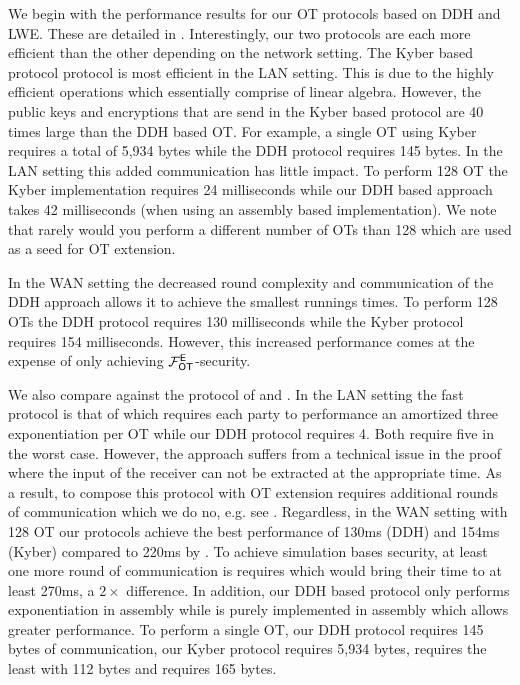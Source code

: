 We begin with the performance results for our OT protocols based on DDH and LWE. These are detailed in . Interestingly, our two protocols are each more efficient than the other depending on the network setting. The Kyber based protocol protocol is most efficient in the LAN setting. This is due to the highly efficient operations which essentially comprise of linear algebra. However, the public keys and encryptions that are send in the Kyber based protocol are 40 times large than the DDH based OT. For example, a single OT using Kyber requires a total of 5,934 bytes while the DDH protocol requires 145 bytes. In the LAN setting this added communication has little impact. To perform 128 OT the Kyber implementation requires 24 milliseconds while our DDH based approach takes 42 milliseconds (when using an assembly based implementation). We note that rarely would you perform a different number of OTs than 128 which are used as a seed for OT extension.

In the WAN setting the decreased round complexity and communication of the DDH approach allows it to achieve the smallest runnings times. To perform 128 OTs the DDH protocol requires 130 milliseconds while the Kyber protocol requires 154 milliseconds. However, this increased performance comes at the expense of only achieving $\mathcal{F}_{\mathsf{OT}}^\mathsf{E}$-security. 

We also compare against the protocol of \cite{LC:ChoOrl15} and \cite{SODA:NaoPin01}. In the LAN setting the fast protocol is that of  \cite{LC:ChoOrl15} which requires each party to performance an amortized three exponentiation per OT while our DDH protocol requires 4. Both require five in the worst case. However, \cite{LC:ChoOrl15} the approach suffers from a technical issue in the proof where the input of the receiver can not be extracted at the appropriate time. As a result, to compose this protocol with OT extension requires additional rounds of communication which we do no, e.g. see \cite[Appendix A]{SP:DKLS18}. Regardless, in the WAN setting with 128 OT our protocols achieve the best performance of 130ms (DDH) and 154ms (Kyber) compared to 220ms by  \cite{LC:ChoOrl15}. To achieve simulation bases security, at least one more round of communication is requires which would bring their time to at least 270ms, a $2\times$ difference. In addition, our DDH based protocol only performs exponentiation in assembly while \cite{LC:ChoOrl15} is purely implemented in assembly which allows greater performance. To perform a single OT, our DDH protocol requires 145 bytes of communication, our Kyber protocol requires 5,934 bytes, \cite{LC:ChoOrl15} requires  the least with 112 bytes and \cite{SODA:NaoPin01} requires 165 bytes.


